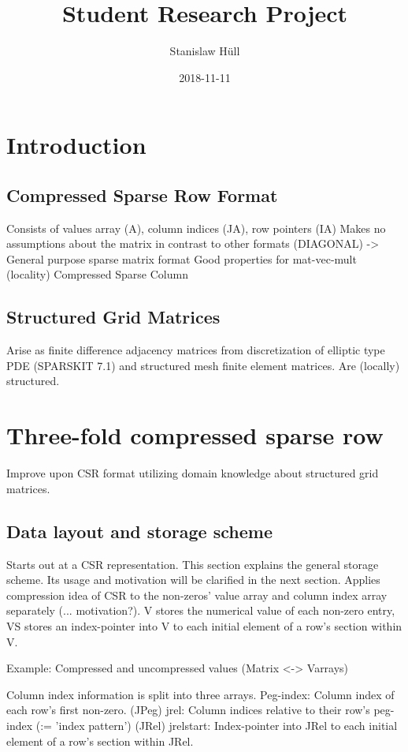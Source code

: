 \documentclass{article}
\author{Stanislaw Hüll}
\title{Student Research Project}
\date{2018-11-11}
\begin{document}
\maketitle

\section{Introduction}

  \subsection{Compressed Sparse Row Format}
    Consists of values array (A), column indices (JA), row pointers (IA)
    Makes no assumptions about the matrix in contrast to other formats (DIAGONAL)
      -> General purpose sparse matrix format
    Good properties for mat-vec-mult (locality)
    Compressed Sparse Column

  \subsection{Structured Grid Matrices}
    Arise as finite difference adjacency matrices from discretization of elliptic type PDE (SPARSKIT 7.1)
      and structured mesh finite element matrices.
    Are (locally) structured.

\section{Three-fold compressed sparse row}
  Improve upon CSR format utilizing domain knowledge about structured grid matrices.

  \subsection{Data layout and storage scheme}
    Starts out at a CSR representation. This section explains the general storage scheme. Its usage and motivation will be clarified in the next section.
    Applies compression idea of CSR to the non-zeros' value array and column index array separately (... motivation?).
    V stores the numerical value of each non-zero entry, VS stores an index-pointer into V to each initial element of a row's section within V.

      Example: Compressed and uncompressed values (Matrix <-> Varrays)

    Column index information is split into three arrays.
    Peg-index: Column index of each row's first non-zero. (JPeg)
    jrel: Column indices relative to their row's peg-index (:= 'index pattern') (JRel)
    jrelstart: Index-pointer into JRel to each initial element of a row's section within JRel.
\end{document}

